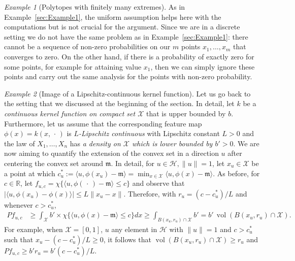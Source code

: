 \documentclass[10pt]{amsart}
\theoremstyle{definition}\newtheorem{defi}[theo]{Definition}\newtheorem{rema}[theo]{Remark}\newtheorem{exam}[theo]{Example}\newtheorem{exem}[theo]{Example}\newtheorem{nota}[theo]{Notation}
\theoremstyle{remark}
\newtheorem{examl}{Example}
\DeclareMathOperator{\vol}{vol}
\newcommand{\R}{\mathbb{R}}
\newcommand{\X}{\mathcal{X}}
\newcommand{\cH}{\mathcal{H}}
\newcommand{\mean}{\mathfrak{m}}
\begin{document}
\begin{examl}[{Polytopes with finitely many extremes}]
As in Example~\ref{sec:Example1}, the uniform assumption helps here with the computations but is not crucial for the argument. Since we are in a discrete setting we do not have the same problem as in Example~\ref{sec:Example1}: there cannot be a sequence of non-zero probabilities on our $m$ points $x_1,\dots,x_m$ that converges to zero. On the other hand, if there is a probability of exactly zero for some points, for example for attaining value $x_1$, then we can simply ignore these points and carry out the same analysis for the points with non-zero probability.
\end{examl}


\begin{examl}[{Image of a Lipschitz-continuous kernel function}] \label{sec:Lower_bnd_P_Lipschitz}
Let us go back to the setting that we discussed at the beginning of the section. In detail, let $k$ be a \emph{continuous kernel function on compact set $\X$} that is upper bounded by $b$. Furthermore, let us assume that the corresponding feature map $\phi(x) = k(x,\,\cdot\,)$ is \emph{$L$-Lipschitz continuous} with Lipschitz constant $L>0$ and the law of $X_1,\dots,X_n$ has \emph{a density on $\X$ which is lower bounded by $b'> 0$}. We are now aiming to quantify the extension of the convex set in a direction $u$ after centering the convex set around $\mean$. In detail, for $u\in \cH, \|u\|=1$, let $x_u \in \X$ be a point at which $c_u^* := \langle u,\phi(x_u) - \mean \rangle = \min_{x\in \X} \langle u,\phi(x) -\mean \rangle$. As before, for $c\in \R$, let $f_{u,c} = \chi \{\langle u, \phi(\,\cdot\,) - \mean \rangle \leq c \}$ and observe that $|\langle u, \phi(x_u) - \phi(x)\rangle| \leq L \|x_u - x\|$. Therefore, with $r_u = (c - c_u^*)/L$ and whenever $c > c_u^*$,
\begin{align*}
P f_{u,c} &\geq \int_\X b' \times \chi\{\langle u, \phi(x) - \mean \rangle \leq c \} dx \geq \int_{B(x_u,r_u)\cap \X} b' = b'\, \vol(B(x_u,r_u)\cap \X).
\end{align*}
For example, when $\X = [0,1]$, $u$ any element in $\cH$ with $\|u\|=1$ and $c > c_u^*$ such that $x_u - (c-c_u^*)/L \geq 0$, it follows that $\vol(B(x_u,r_u) \cap \X) \geq r_u$ and $P f_{u,c} \geq b'r_u = b' (c- c_u^*)/L$.


\end{examl}
\end{document}
